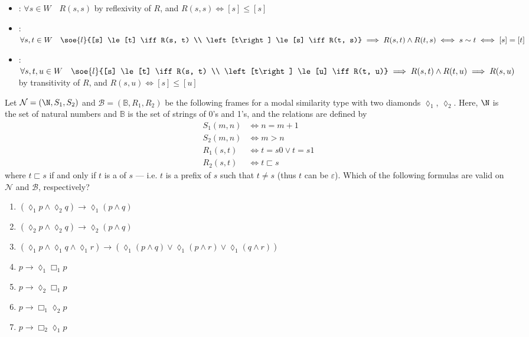 \documentclass[a4paper, 12pt]{report}
\begin{document}
{\begin{enumerate}[label=(\alph*)]
                \begin{itemize}
                    \item {}: $\forall s \in W \quad R(s, s)$ by reflexivity of $R$, and $R(s, s) \iff [s] \le [s]$
                    \item {}: $\forall s, t \in W \quad \soe{l}{[s] \le [t] \iff R(s, t) \\ \left[t\right] \le [s] \iff R(t, s)} \implies R(s, t) \land R(t, s) \iff s \sim t \iff [s] = [t]$
                    \item {}: $\forall s, t, u \in W \quad \soe{l}{[s] \le [t] \iff R(s, t) \\  \left[t\right] \le [u] \iff R(t, u)} \implies R(s, t) \land R(t, u)\implies R(s, u)$ by transitivity of $R$, and $R(s, u) \iff [s] \le [u]$
                \end{itemize}
        \end{enumerate}
    }

     Let $\mathcal N = (\N, S_1, S_2)$ and $\mathcal B = (\mathbb B, R_1, R_2)$ be the following frames for a modal similarity type with two diamonds $\lozenge_1$, $\lozenge_2$. Here, $\N$ is the set of natural numbers and $\mathbb B$ is the set of strings of 0's and 1's, and the relations are defined by
        \begin{equation*}
            \begin{split}
                S_1(m, n) &\iff n = m + 1 \\
                S_2(m, n) &\iff m > n \\
                R_1(s, t) &\iff t = s0 \lor t = s1 \\
                R_2(s, t) &\iff t \sqsubset s
            \end{split}
        \end{equation*}
        where $t \sqsubset s$ if and only if $t$ is a  of $s$ --- i.e. $t$ is a prefix of $s$ such that $t \neq s$ (thus $t$ can be $\varepsilon$). Which of the following formulas are valid on $\mathcal N$ and $\mathcal B$, respectively?

    \begin{enumerate}[label=(\alph*)]
        \item $(\lozenge_1 p \land \lozenge_2 q) \rightarrow \lozenge_1 (p \land q)$
        \item $(\lozenge_2 p \land \lozenge_2 q) \rightarrow \lozenge_2 (p \land q)$
        \item $(\lozenge_1 p \land \lozenge_1 q \land \lozenge_1 r) \rightarrow (\lozenge_1 (p \land q) \lor \lozenge_1(p \land r) \lor \lozenge_1 (q \land r))$
        \item $p \rightarrow \lozenge_1 \Box_1 p$
        \item $p \rightarrow \lozenge_2 \Box_1 p$
        \item $p \rightarrow \Box_1 \lozenge_2 p$
        \item $p \rightarrow \Box_2 \lozenge_1 p$
    \end{enumerate}
\end{document}
